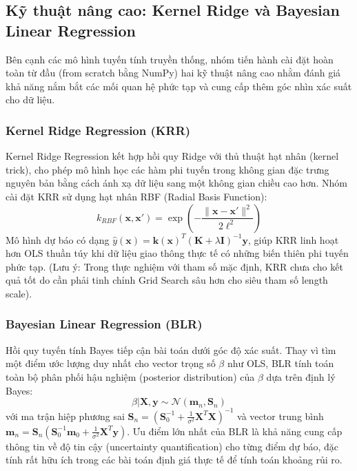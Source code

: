\subsection{Kỹ thuật nâng cao: Kernel Ridge và Bayesian Linear Regression}

Bên cạnh các mô hình tuyến tính truyền thống, nhóm tiến hành cài đặt hoàn toàn từ đầu (from scratch bằng NumPy) hai kỹ thuật nâng cao nhằm đánh giá khả năng nắm bắt các mối quan hệ phức tạp và cung cấp thêm góc nhìn xác suất cho dữ liệu.

\subsubsection{Kernel Ridge Regression (KRR)}
Kernel Ridge Regression kết hợp hồi quy Ridge với thủ thuật hạt nhân (kernel trick), cho phép mô hình học các hàm phi tuyến trong không gian đặc trưng nguyên bản bằng cách ánh xạ dữ liệu sang một không gian chiều cao hơn. Nhóm cài đặt KRR sử dụng hạt nhân RBF (Radial Basis Function):
\begin{equation}
    k_{RBF}(\mathbf{x}, \mathbf{x}') = \exp\left( - \frac{\|\mathbf{x} - \mathbf{x}'\|^2}{2\ell^2} \right)
\end{equation}
Mô hình dự báo có dạng $\hat{y}(\mathbf{x}) = \mathbf{k}(\mathbf{x})^T (\mathbf{K} + \lambda \mathbf{I})^{-1}\mathbf{y}$, giúp KRR linh hoạt hơn OLS thuần túy khi dữ liệu giao thông thực tế có những biến thiên phi tuyến phức tạp. (Lưu ý: Trong thực nghiệm với tham số mặc định, KRR chưa cho kết quả tốt do cần phải tinh chỉnh Grid Search sâu hơn cho siêu tham số length scale).

\subsubsection{Bayesian Linear Regression (BLR)}
Hồi quy tuyến tính Bayes tiếp cận bài toán dưới góc độ xác suất. Thay vì tìm một điểm ước lượng duy nhất cho vector trọng số $\beta$ như OLS, BLR tính toán toàn bộ phân phối hậu nghiệm (posterior distribution) của $\beta$ dựa trên định lý Bayes:
\begin{equation}
    \beta | \mathbf{X}, \mathbf{y} \sim \mathcal{N}(\mathbf{m}_n, \mathbf{S}_n)
\end{equation}
với ma trận hiệp phương sai $\mathbf{S}_n = (\mathbf{S}_0^{-1} + \frac{1}{\sigma^2}\mathbf{X}^T\mathbf{X})^{-1}$ và vector trung bình $\mathbf{m}_n = \mathbf{S}_n(\mathbf{S}_0^{-1}\mathbf{m}_0 + \frac{1}{\sigma^2}\mathbf{X}^T\mathbf{y})$.
Ưu điểm lớn nhất của BLR là khả năng cung cấp thông tin về độ tin cậy (uncertainty quantification) cho từng điểm dự báo, đặc tính rất hữu ích trong các bài toán định giá thực tế để tính toán khoảng rủi ro.

